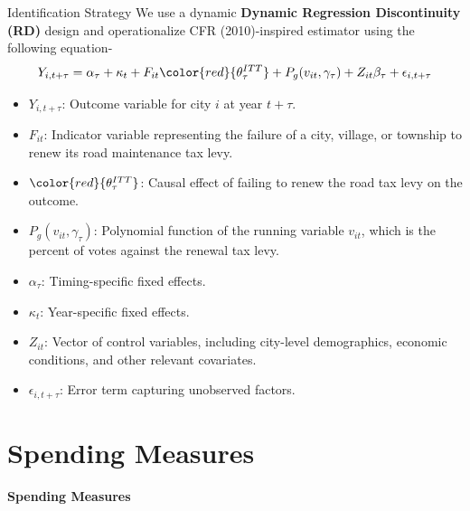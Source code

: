 \documentclass{beamer}
\begin{document}
\begin{frame}{Identification Strategy}
    We use a dynamic \textbf{Dynamic Regression Discontinuity (RD)} design and operationalize CFR (2010)-inspired estimator using the following equation-
        \begin{equation} 
            Y_{i,t+\tau} = \alpha_\tau + \kappa_t + F_{it} {\color{red}{\theta_{\tau}^{ITT}}} + P_g (v_{it}, \gamma_\tau) + Z_{it} \beta_\tau + \epsilon_{i,t + \tau}
            \label{eq:itt_estimator}
        \end{equation}
        \begin{itemize}
            \item[] \scriptsize $Y_{i,t+\tau}$: Outcome variable for city $i$ at year $t + \tau$.
            \item[] \scriptsize $F_{it}$: Indicator variable representing the failure of a city, village, or township to renew its road maintenance tax levy.
            \item[] \scriptsize ${\color{red}{\theta_{\tau}^{ITT}}}$: Causal effect of failing to renew the road tax levy on the outcome.
            \item[] \scriptsize $P_g (v_{it}, \gamma_\tau)$: Polynomial function of the running variable $v_{it}$, which is the percent of votes against the renewal tax levy.
            \item[] \scriptsize $\alpha_\tau$: Timing-specific fixed effects.
            \item[] \scriptsize $\kappa_t$: Year-specific fixed effects.
            \item[] \scriptsize $Z_{it}$: Vector of control variables, including city-level demographics, economic conditions, and other relevant covariates.
            \item[] \scriptsize $\epsilon_{i,t + \tau}$: Error term capturing unobserved factors.
        \end{itemize}
\end{frame}

\section{Spending Measures}

\begin{frame}
    \begin{center}
        \vspace{2cm}
        {\LARGE \textbf{Spending Measures}}
    \end{center}
\end{frame}
\end{document}
